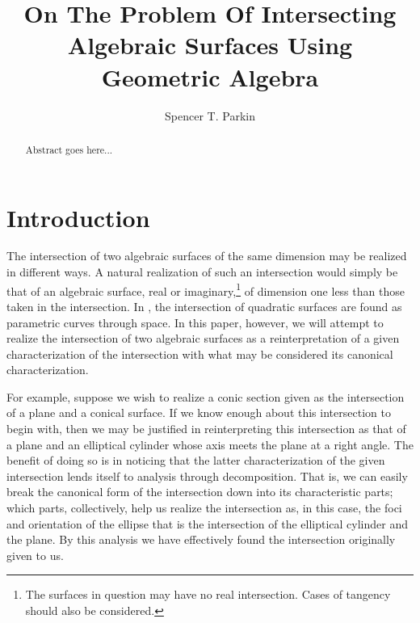 \documentclass{birkjour}
\theoremstyle{definition}
\theoremstyle{remark}
\numberwithin{equation}{section}
\begin{document}
\title{On The Problem Of Intersecting\\Algebraic Surfaces Using\\Geometric Algebra}

\author{Spencer T. Parkin}
\address{102 W. 500 S., \\
Salt Lake City, UT  84101} 



\begin{abstract}
Abstract goes here...
\end{abstract}


\maketitle

\section{Introduction}

The intersection of two algebraic surfaces of the same dimension may be
realized in different ways.  A natural realization of such an intersection would
simply be that of an algebraic surface, real or imaginary,\footnote{The surfaces
in question may have no real intersection.  Cases of tangency should also be considered.}
of dimension one
less than those taken in the intersection.  In \cite{}, the intersection of quadratic surfaces
are found as parametric curves through space.
In this paper, however, we will attempt to realize the intersection of two algebraic surfaces as a
reinterpretation of a given characterization of the intersection with what may be considered
its canonical characterization.

For example, suppose we wish to realize a conic section given as the intersection of a plane
and a conical surface.  If we know enough about this intersection to begin with, then we may
be justified in reinterpreting this intersection as that of a plane and an elliptical cylinder whose
axis meets the plane at a right angle.  The benefit of doing so is in noticing that the latter
characterization of the given intersection lends itself to analysis through decomposition.
That is, we can easily break the canonical form of the intersection down into its characteristic
parts; which parts, collectively, help us realize the intersection as, in this case, the foci and orientation of
the ellipse that is the intersection of the elliptical cylinder and the plane.  By this analysis
we have effectively found the intersection originally given to us.
\end{document}
